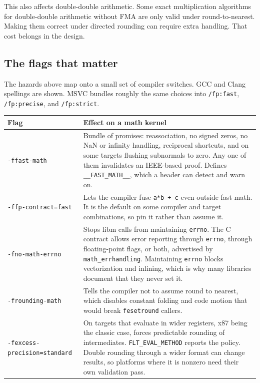 \documentclass[manuscript, nonacm]{acmart}
\begin{document}
  This also affects double-double arithmetic. Some exact multiplication
  algorithms for double-double arithmetic without FMA are only valid under
  round-to-nearest. Making them correct under directed rounding can require
  extra handling. That cost belongs in the design.

  \subsection{The flags that matter}

  The hazards above map onto a small set of compiler switches. GCC and
  Clang spellings are shown. MSVC bundles roughly the same choices into
  \texttt{/fp:fast}, \texttt{/fp:precise}, and \texttt{/fp:strict}.

  \begin{table}[tbp]
    \centering
    \begin{tabular}{lp{8cm}}
      \toprule
      Flag & Effect on a math kernel \\
      \midrule
      \texttt{-ffast-math}
      & Bundle of promises: reassociation, no signed zeros, no NaN or
      infinity handling, reciprocal shortcuts, and on some targets
      flushing subnormals to zero. Any one of them invalidates an
      IEEE-based proof. Defines \texttt{\_\_FAST\_MATH\_\_}, which a
      header can detect and warn on. \\
      \texttt{-ffp-contract=fast}
      & Lets the compiler fuse \texttt{a*b + c} even outside fast math.
      It is the default on some compiler and target combinations, so
      pin it rather than assume it. \\
      \texttt{-fno-math-errno}
      & Stops libm calls from maintaining \texttt{errno}. The C
      contract allows error reporting through \texttt{errno}, through
      floating-point flags, or both, advertised by
      \texttt{math\_errhandling}. Maintaining \texttt{errno} blocks
      vectorization and inlining, which is why many libraries document
      that they never set it. \\
      \texttt{-frounding-math}
      & Tells the compiler not to assume round to nearest, which
      disables constant folding and code motion that would break
      \texttt{fesetround} callers. \\
      \texttt{-fexcess-precision=standard}
      & On targets that evaluate in wider registers, x87 being the
      classic case, forces predictable rounding of intermediates.
      \texttt{FLT\_EVAL\_METHOD} reports the policy. Double rounding
      through a wider format can change results, so platforms where it
      is nonzero need their own validation pass. \\
      \bottomrule
    \end{tabular}
  \end{table}
\end{document}
